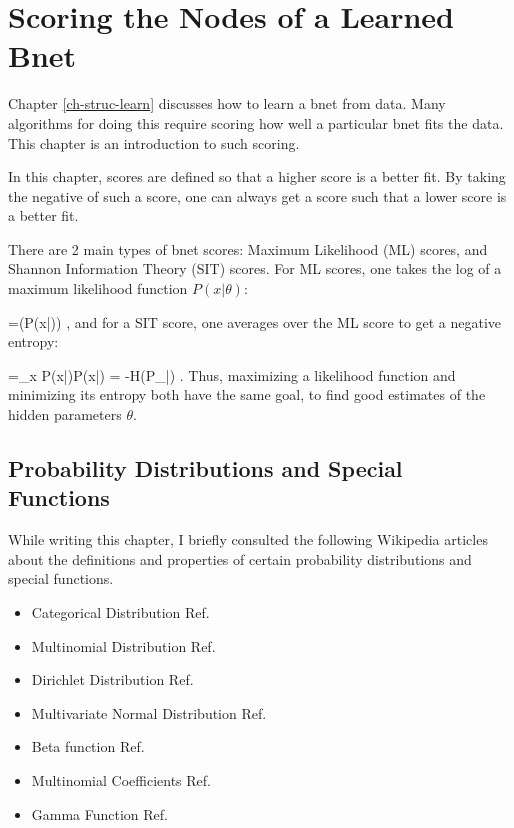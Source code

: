 \chapter{Scoring the Nodes of a Learned Bnet}
\label{ch-scoring}

Chapter \ref{ch-struc-learn}
discusses how 
to learn a bnet  from data.
Many algorithms for
doing this require scoring
how well
a particular bnet fits
the data.
This chapter 
is an introduction to
such scoring.
 

In this chapter,
scores are defined 
so that a higher score
is a better fit.
By taking
the negative
of such a score,
one can 
always get a score
such that a lower score is a
 better fit.

There are 2 main types of
bnet scores: Maximum Likelihood (ML) scores,
and Shannon Information Theory (SIT)
scores.
For ML scores,
one takes
the log
of a maximum
likelihood function $P(x|\theta)$:

\beq
{}=\ln(P(x|\theta))
\;,
\eeq
and for a SIT score, 
one averages over the ML score
to get a negative entropy:

\beq
{}
=\sum_x P(x|\theta)\ln P(x|\theta)
=
-H(P_{\rvx|\theta})
\;.
\eeq
Thus, maximizing a 
likelihood function
and minimizing its entropy both
have the
same goal,
to find 
good estimates of the
hidden parameters $\theta$. 

\section*{
Probability Distributions
and Special Functions}

While
writing
this chapter,
I briefly consulted 
the following Wikipedia articles
about
the definitions
and properties of
certain
probability
distributions
and special
functions.
\begin{itemize}
\item
Categorical Distribution
 Ref.\cite{wiki-categorical}
\item
Multinomial Distribution
 Ref.\cite{wiki-multi-dist}
\item
Dirichlet Distribution 
Ref.\cite{wiki-diri}
\item 
Multivariate Normal Distribution
Ref.\cite{wiki-multi-normal}

\item
Beta function 
Ref.\cite{wiki-beta-fun}
\item
Multinomial Coefficients
 Ref.\cite{wiki-multi-thm}
\item 
Gamma Function
Ref.\cite{wiki-gamma-fun}
\end{itemize}

